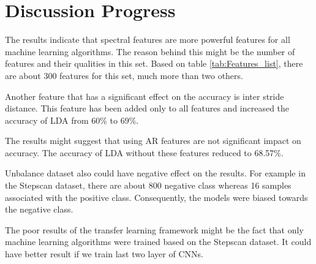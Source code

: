 \section{Discussion Progress}

The results indicate that spectral features are more powerful features for all machine learning algorithms. The reason behind this might be the number of features and their qualities in this set. Based on table \ref{tab:Features_list}, there are about 300 features for this set, much more than two others.

Another feature that has a significant effect on the accuracy is inter stride distance. This feature has been added only to all features and increased the accuracy of LDA from 60\% to 69\%. 
 
The results might suggest that using AR features are not significant impact on accuracy. The accuracy of LDA without these features reduced to 68.57\%. 

Unbalance dataset also could have negative effect on the results. For example in the Stepscan dataset, there are about 800 negative class whereas 16 samples associated with the positive class. Consequently, the models were biased towards the negative class. 


The poor results of the transfer learning framework might be the fact that only machine learning algorithms were trained based on the Stepscan dataset. It could have better result if we train last two layer of CNNs. 












